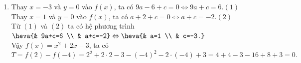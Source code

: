\begin{bt}
{\begin{enumerate}
\begin{center}
			\end{center}
			\item Thay $x=-3$ và $y=0$ vào $f(x)$, ta có $9a-6+c=0\Leftrightarrow9a+c=6$.\hfill$(1)$\\
			Thay $x=1$ và $y=0$ vào $f(x)$, ta có $a+2+c=0\Leftrightarrow a+c=-2$.\hfill$(2)$\\
			Từ $(1)$ và $(2)$ ta có hệ phương trình $\heva{& 9a+c=6 \\ & a+c=-2}\Leftrightarrow\heva{& a=1 \\ & c=-3.}$\\
			Vậy $f(x)=x^2+2x-3$, ta có
			\[
			T=f(2)-f(-4)=2^2+2\cdot2-3-(-4)^2-2\cdot(-4)+3=4+4-3-16+8+3=0.
			\]
		\end{enumerate}
	}
\end{bt}

